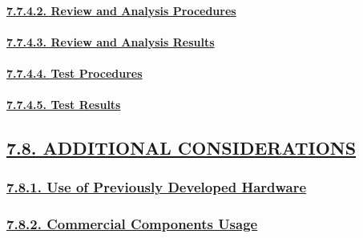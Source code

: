 \documentclass[
]{article}
\begin{document}
\hypertarget{review-and-analysis-procedures}{%
\paragraph{\texorpdfstring{\protect\hyperlink{review-and-analysis-procedures-1}{7.7.4.2.
Review and Analysis
Procedures}}{7.7.4.2. Review and Analysis Procedures}}\label{review-and-analysis-procedures}}

\hypertarget{review-and-analysis-results}{%
\paragraph{\texorpdfstring{\protect\hyperlink{review-and-analysis-results-1}{7.7.4.3.
Review and Analysis
Results}}{7.7.4.3. Review and Analysis Results}}\label{review-and-analysis-results}}

\hypertarget{test-procedures}{%
\paragraph{\texorpdfstring{\protect\hyperlink{test-procedures-1}{7.7.4.4.
Test Procedures}}{7.7.4.4. Test Procedures}}\label{test-procedures}}

\hypertarget{test-results}{%
\paragraph{\texorpdfstring{\protect\hyperlink{test-results-1}{7.7.4.5.
Test Results}}{7.7.4.5. Test Results}}\label{test-results}}

\hypertarget{additional-considerations}{%
\subsection{\texorpdfstring{\protect\hyperlink{additional-considerations-1}{7.8.
ADDITIONAL
CONSIDERATIONS}}{7.8. ADDITIONAL CONSIDERATIONS}}\label{additional-considerations}}

\hypertarget{use-of-previously-developed-hardware}{%
\subsubsection{\texorpdfstring{\protect\hyperlink{use-of-previously-developed-hardware-1}{7.8.1.
Use of Previously Developed
Hardware}}{7.8.1. Use of Previously Developed Hardware}}\label{use-of-previously-developed-hardware}}

\hypertarget{commercial-components-usage}{%
\subsubsection{\texorpdfstring{\protect\hyperlink{commercial-components-usage-1}{7.8.2.
Commercial Components
Usage}}{7.8.2. Commercial Components Usage}}\label{commercial-components-usage}}
\end{document}
